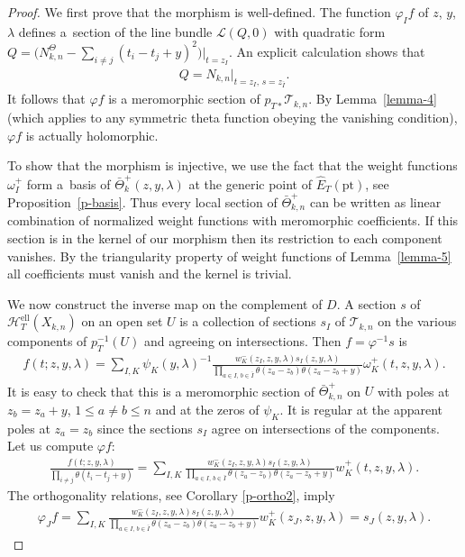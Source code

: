 \documentclass[10pt,a4paper]{amsart}
\numberwithin{equation}{section}
\begin{document}
\begin{proof} We first prove that the morphism is well-defined. The function $\varphi_If$ of $z$, $y$, $\lambda$ defines a~section of the line bundle $\mathcal L(Q,0)$ with quadratic form $Q=\Big(N^\Theta_{k,n}-\sum\limits_{i\neq j}(t_i-t_j+y)^2\Big)\big|_{t=z_I}$. An explicit calculation shows that
 \begin{gather*}
 Q=N_{k,n}|_{t=z_I,\, s=z_{\bar I}}.
 \end{gather*}
 It follows that $\varphi f$ is a meromorphic section of $p_{T*}\mathcal T_{k,n}$. By Lemma~\ref{lemma-4} (which applies to any symmetric theta function obeying the vanishing condition), $\varphi f$ is actually holomorphic.

To show that the morphism is injective, we use the fact that the weight functions $\omega_I^+$ form a~basis of $\bar\Theta^+_k(z,y,\lambda)$ at the generic point of $\hat E_T(\mathrm{pt})$, see Proposition~\ref{p-basis}. Thus every local section of $\bar\Theta^+_{k,n}$ can be written as linear combination of normalized weight functions with meromorphic coefficients. If this section is in the kernel of our morphism then its restriction to each component vanishes. By the triangularity property of weight functions of Lemma~\ref{lemma-5} all coefficients must vanish and the kernel is trivial.

 We now construct the inverse map on the complement of $D$. A section $s$ of $\mathcal H^{\mathrm{ell}}_T(X_{k,n})$ on an open set $U$ is a collection of sections $s_I$ of $\mathcal T_{k,n}$ on the various components of $p_T^{-1}(U)$ and agreeing on intersections. Then $f=\varphi^{-1}s$ is
 \begin{gather*}
 f(t;z,y,\lambda)= \sum_{I,K} \psi_K(y,\lambda)^{-1} \frac{w_K^-(z_I,z,y,\lambda)s_I(z,y,\lambda)} {\prod\limits_{a\in I,\,b\in\bar I}\theta(z_a-z_b)\theta(z_a-z_b+y)} \omega_K^+(t,z,y,\lambda).
 \end{gather*}
 It is easy to check that this is a meromorphic section of $\bar\Theta^+_{k,n}$ on $U$ with poles at $z_b=z_a+y$, $1\leq a\neq b\leq n$ and at the zeros of $\psi_K$. It is regular at the apparent poles at $z_a=z_b$ since the sections $s_I$ agree on intersections of the components. Let us compute $\varphi f$:
 \begin{gather*}
 \frac{f(t;z,y,\lambda)} {\prod\limits_{i\neq j}\theta(t_i-t_j+y)} =\sum_{I,K}\frac{w_K^-(z_I,z,y,\lambda)s_I(z,y,\lambda)} {\prod\limits_{a\in I,\,b\in\bar I}\theta(z_a-z_b)\theta(z_a-z_b+y)} w_K^+(t,z,y,\lambda).
 \end{gather*}
 The orthogonality relations, see Corollary \ref{p-ortho2}, imply
 \begin{gather*}
 \varphi_Jf =\sum_{I,K} \frac{w_K^-(z_I,z,y,\lambda) s_I(z,y,\lambda)} {\prod\limits_{a\in I,\, b\in\bar I}\theta(z_a-z_b) \theta(z_a-z_b+y)}w_K^+(z_J,z,y,\lambda) =s_J(z,y,\lambda).\tag*{\qed}
 \end{gather*}\renewcommand{\qed}{}
\end{proof}
\end{document}
